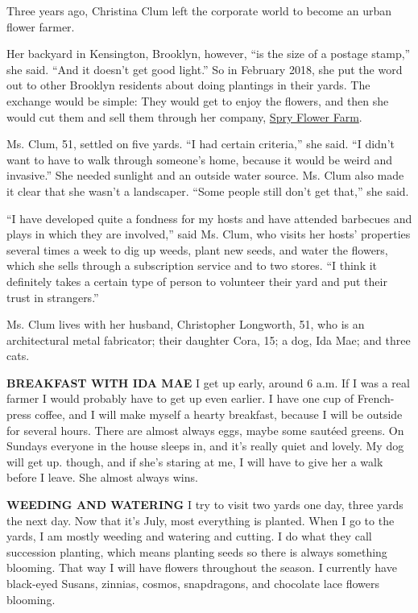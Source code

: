 Three years ago, Christina Clum left the corporate world to become an
urban flower farmer.

Her backyard in Kensington, Brooklyn, however, ``is the size of a
postage stamp,'' she said. ``And it doesn't get good light.'' So in
February 2018, she put the word out to other Brooklyn residents about
doing plantings in their yards. The exchange would be simple: They would
get to enjoy the flowers, and then she would cut them and sell them
through her company, \href{https://spryflowerfarm.com/}{Spry Flower
Farm}.

Ms. Clum, 51, settled on five yards. ``I had certain criteria,'' she
said. ``I didn't want to have to walk through someone's home, because it
would be weird and invasive.'' She needed sunlight and an outside water
source. Ms. Clum also made it clear that she wasn't a landscaper. ``Some
people still don't get that,'' she said.

``I have developed quite a fondness for my hosts and have attended
barbecues and plays in which they are involved,'' said Ms. Clum, who
visits her hosts' properties several times a week to dig up weeds, plant
new seeds, and water the flowers, which she sells through a subscription
service and to two stores. ``I think it definitely takes a certain type
of person to volunteer their yard and put their trust in strangers.''

Ms. Clum lives with her husband, Christopher Longworth, 51, who is an
architectural metal fabricator; their daughter Cora, 15; a dog, Ida Mae;
and three cats.

\textbf{BREAKFAST WITH IDA MAE} I get up early, around 6 a.m. If I was a
real farmer I would probably have to get up even earlier. I have one cup
of French-press coffee, and I will make myself a hearty breakfast,
because I will be outside for several hours. There are almost always
eggs, maybe some sautéed greens. On Sundays everyone in the house sleeps
in, and it's really quiet and lovely. My dog will get up. though, and if
she's staring at me, I will have to give her a walk before I leave. She
almost always wins.

\textbf{WEEDING AND WATERING} I try to visit two yards one day, three
yards the next day. Now that it's July, most everything is planted. When
I go to the yards, I am mostly weeding and watering and cutting. I do
what they call succession planting, which means planting seeds so there
is always something blooming. That way I will have flowers throughout
the season. I currently have black-eyed Susans, zinnias, cosmos,
snapdragons, and chocolate lace flowers blooming.

